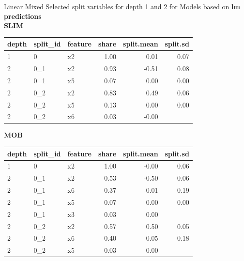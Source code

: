 \documentclass[9pt, xcolor=table]{beamer}
\begin{document}
\begin{frame}{Linear Mixed}
Selected split variables for depth 1 and 2 for Models based on \textbf{lm predictions}\\
\textbf{SLIM}

\begin{table}[ht]
\centering
\begin{tabular}{lllrrr}
  \hline
depth & split\_id & feature & share & split.mean & split.sd \\ 
  \hline
1 & 0 & x2 & 1.00 & 0.01 & 0.07 \\ 
  2 & 0\_1 & x2 & 0.93 & -0.51 & 0.08 \\ 
  2 & 0\_1 & x5 & 0.07 & 0.00 & 0.00 \\ 
  2 & 0\_2 & x2 & 0.83 & 0.49 & 0.06 \\ 
  2 & 0\_2 & x5 & 0.13 & 0.00 & 0.00 \\ 
  2 & 0\_2 & x6 & 0.03 & -0.00 &  \\ 
   \hline
\end{tabular}
\end{table}

\textbf{MOB}
\begin{table}[ht]
\centering
\begin{tabular}{lllrrr}
  \hline
depth & split\_id & feature & share & split.mean & split.sd \\ 
  \hline
1 & 0 & x2 & 1.00 & -0.00 & 0.06 \\ 
  2 & 0\_1 & x2 & 0.53 & -0.50 & 0.06 \\ 
  2 & 0\_1 & x6 & 0.37 & -0.01 & 0.19 \\ 
  2 & 0\_1 & x5 & 0.07 & 0.00 & 0.00 \\ 
  2 & 0\_1 & x3 & 0.03 & 0.00 &  \\ 
  2 & 0\_2 & x2 & 0.57 & 0.50 & 0.05 \\ 
  2 & 0\_2 & x6 & 0.40 & 0.05 & 0.18 \\ 
  2 & 0\_2 & x5 & 0.03 & 0.00 &  \\ 
   \hline
\end{tabular}
\end{table}
\end{frame}
\end{document}
